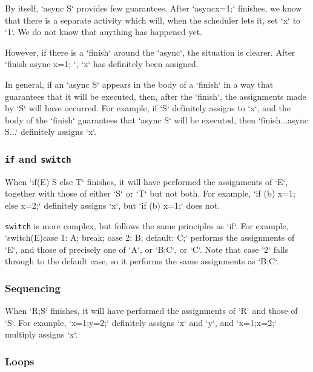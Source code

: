 By itself, \xcd`async S` provides few guarantees.  After \xcd`async{x=1;}`
finishes, we know that there is a separate activity which will, when the
scheduler lets it, set \xcd`x` to \xcd`1`.  We do not know that anything has
happened yet.

However, if there is a \xcd`finish` around the \xcd`async`, the situation is
clearer.  After \xcd`finish{ async{ x=1; }}`, \xcd`x` has definitely been
assigned.  

In general, if an \xcd`async S` appears in the body of a \xcd`finish` in a way
that guarantees that it will be executed, then, after the \xcd`finish`, the
assignments made by \xcd`S` will have occurred.  For example, if \xcd`S`
definitely assigns to \xcd`x`, and the body of the \xcd`finish` guarantees
that \xcd`async S` will be executed, then \xcd`finish{...async S...}`
definitely assigns \xcd`x`.



\subsubsection{{\tt if} and {\tt switch}}

When \xcd`if(E) S else T` finishes, it will have performed the assignments of
\xcd`E`, together with those of either \xcd`S` or \xcd`T` but not both.  For
example, \xcd`if (b) x=1; else x=2;` definitely assigns \xcd`x`,
but \xcd`if (b) x=1;` does not.

{\tt switch} is more complex, but follows the same principles as \xcd`if`.
For example, \xcd`switch(E){case 1: A; break; case 2: B; default: C;}`  
performs the assignments of \xcd`E`, and those of precisely one of \xcd`A`, or
\xcd`B;C`, or \xcd`C`.  Note that case \xcd`2` falls through to the default
case, so it performs the same assignments as \xcd`B;C`.

\subsubsection{Sequencing}

When \xcd`R;S` finishes, it will have performed the assignments of \xcd`R` and
those of \xcd`S`.  For example, \xcd`x=1;y=2;` definitely assigns \xcd`x` and
\xcd`y`, and \xcd`x=1;x=2;` multiply assigns \xcd`x`. 


\subsubsection{Loops}

